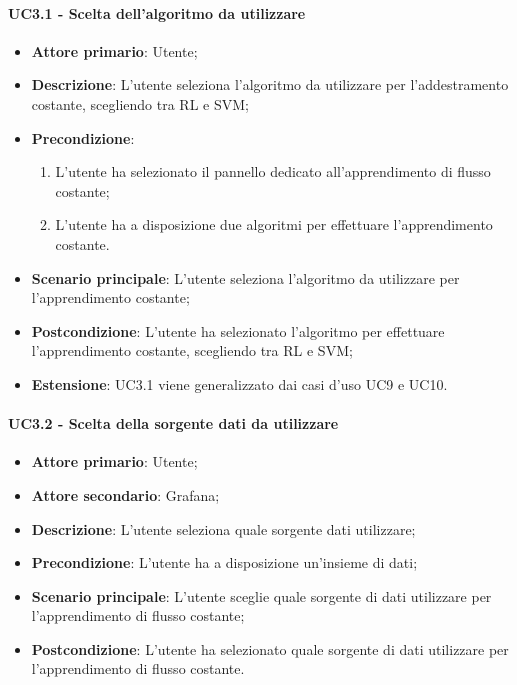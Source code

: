 \paragraph{UC3.1 - Scelta dell'algoritmo da utilizzare}
\label{para:uc3.1}
\begin{itemize}
  \item \textbf{Attore primario}: Utente;
  \item \textbf{Descrizione}: L'utente seleziona l'algoritmo da utilizzare per l'addestramento costante, scegliendo tra RL e SVM;
  \item \textbf{Precondizione}:
  \begin{enumerate}
    \item L'utente ha selezionato il pannello dedicato all'apprendimento di flusso costante;
    \item L'utente ha a disposizione due algoritmi per effettuare l'apprendimento costante.
  \end{enumerate}
  \item \textbf{Scenario principale}: L'utente seleziona l'algoritmo da utilizzare per l'apprendimento costante;
  \item \textbf{Postcondizione}: L'utente ha selezionato l'algoritmo per effettuare l'apprendimento costante, scegliendo tra RL e SVM;
  \item \textbf{Estensione}: UC3.1 viene generalizzato dai casi d'uso UC9 e UC10.
\end{itemize}

\paragraph{UC3.2 - Scelta della sorgente dati da utilizzare}
\label{para:uc3.2}
\begin{itemize}
  \item \textbf{Attore primario}: Utente;
  \item \textbf{Attore secondario}: Grafana;
  \item \textbf{Descrizione}: L'utente seleziona quale sorgente dati utilizzare;
  \item \textbf{Precondizione}: L'utente ha a disposizione un'insieme di dati;
  \item \textbf{Scenario principale}: L'utente sceglie quale sorgente di dati utilizzare per l'apprendimento di flusso costante;
  \item \textbf{Postcondizione}: L'utente ha selezionato quale sorgente di dati utilizzare per l'apprendimento di flusso costante.
\end{itemize}

